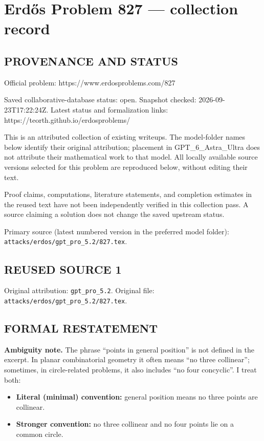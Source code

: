 \section*{Erd\H{o}s Problem 827 --- collection record}

\subsection*{PROVENANCE AND STATUS}
Official problem: https://www.erdosproblems.com/827

Saved collaborative-database status: open.
Snapshot checked: 2026-09-23T17:22:24Z.
Latest status and formalization links: https://teorth.github.io/erdosproblems/

This is an attributed collection of existing writeups. The model-folder names below identify their original attribution; placement in GPT\_6\_Astra\_Ultra does not attribute their mathematical work to that model. All locally available source versions selected for this problem are reproduced below, without editing their text.

Proof claims, computations, literature statements, and completion estimates in the reused text have not been independently verified in this collection pass. A source claiming a solution does not change the saved upstream status.

Primary source (latest numbered version in the preferred model folder): \texttt{attacks/erdos/gpt\_pro\_5.2/827.tex}.

\subsection*{REUSED SOURCE 1}
Original attribution: \texttt{gpt\_pro\_5.2}.
Original file: \texttt{attacks/erdos/gpt\_pro\_5.2/827.tex}.


\subsection*{FORMAL RESTATEMENT}
\textbf{Ambiguity note.} The phrase ``points in general position'' is not defined in the excerpt. In planar combinatorial geometry it often means ``no three collinear''; sometimes, in circle-related problems, it also includes ``no four concyclic''. I treat both:
\begin{itemize}
\item \textbf{Literal (minimal) convention:} general position means no three points are collinear.
\item \textbf{Stronger convention:} no three collinear and no four points lie on a common circle.
\end{itemize}

